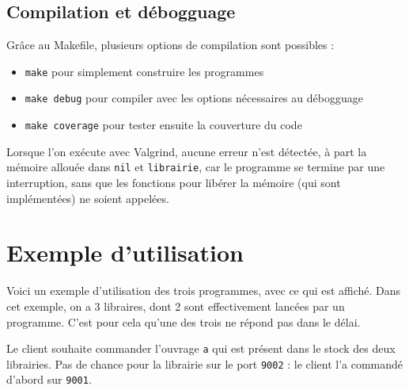 \documentclass[10pt,a4paper]{article}
\begin{document}
\begin{multicols}{2}
\section{Compilation et débogguage}

Grâce au Makefile, plusieurs options de compilation sont possibles :
\begin{itemize}
	\item \texttt{make} pour simplement construire les programmes
	\item \texttt{make debug} pour compiler avec les options nécessaires au débogguage
	\item \texttt{make coverage} pour tester ensuite la couverture du code
\end{itemize}

Lorsque l'on exécute avec Valgrind, aucune erreur n'est détectée, à part la mémoire allouée dans \texttt{nil} et \texttt{librairie}, car le programme se termine par une interruption, sans que les fonctions pour libérer la mémoire (qui sont implémentées) ne soient appelées.


\end{multicols}





\newpage

\section{Exemple d'utilisation}

Voici un exemple d'utilisation des trois programmes, avec ce qui est affiché. 
Dans cet exemple, on a 3 libraires, dont 2 sont effectivement lancées par un programme. C'est pour cela qu'une des trois ne répond pas dans le délai.

Le client souhaite commander l'ouvrage \texttt{a} qui est présent dans le stock des deux librairies. Pas de chance pour la librairie sur le port \texttt{9002} : le client l'a commandé d'abord sur \texttt{9001}.
\end{document}
